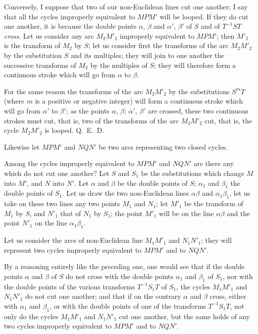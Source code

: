 \documentclass{article}
\begin{document}
Conversely, I suppose that two of our non-Euclidean lines cut one another; I say that all the cycles improperly equivalent to $MPM'$ will be looped. If they do cut one another, it is because the double points $\alpha$, $\beta$ and $\alpha'$, $\beta'$ of $S$ and of $T^{-1}ST$ \emph{cross}. Let us consider any arc $M_{2}M'_{2}$ improperly equivalent to $MPM'$; then $M'_{2}$ is the transform of $M_{2}$ by $S$; let us consider first the transforms of the arc $M_{2}M'_{2}$ by the substitution $S$ and its multiples; they will join to one another the successive transforms of $M_{2}$ by the multiples of $S$; they will therefore form a continuous stroke which will go from $\alpha$ to $\beta$.

For the same reason the transforms of the arc $M_{2}M'_{2}$ by the substitutions $S^{m}T$ (where $m$ is a positive or negative integer) will form a continuous stroke which will go from $\alpha'$ to $\beta'$; as the points $\alpha$, $\beta$; $\alpha'$, $\beta'$ are crossed, these two continuous strokes must cut, that is, two of the transforms of the arc $M_{2}M'_{2}$ cut, that is, the cycle $M_{2}M'_{2}$ is looped. Q.~E.~D.

Likewise let $MPM'$ and $NQN'$ be two arcs representing two closed cycles.

Among the cycles improperly equivalent to $MPM'$ and $NQN'$ are there any which do not cut one another? Let $S$ and $S_{1}$ be the substitutions which change $M$ into $M'$, and $N$ into $N'$. Let $\alpha$ and $\beta$ be the double points of $S$; $\alpha_{1}$ and $\beta_{1}$ the double points of $S_{1}$. Let us draw the two non-Euclidean lines $\alpha\beta$ and $\alpha_{1}\beta_{1}$, let us take on these two lines any two points $M_{1}$ and $N_{1}$; let $M'_{1}$ be the transform of $M_{1}$ by $S$, and $N'_{1}$ that of $N_{1}$ by $S_{1}$; the point $M'_{1}$ will be on the line $\alpha\beta$ and the point $N'_{1}$ on the line $\alpha_{1}\beta_{1}$.

Let us consider the arcs of non-Euclidean line $M_{1}M'_{1}$ and $N_{1}N'_{1}$; they will represent two cycles improperly equivalent to $MPM'$ and to $NQN'$.


By a reasoning entirely like the preceding one, one would see that if the double points $\alpha$ and $\beta$ of $S$ do not cross with the double points $\alpha_{1}$ and $\beta_{1}$ of $S_{1}$, nor with the double points of the various transforms $T^{-1}S_{1}T$ of $S_{1}$, the cycles $M_{1}M'_{1}$ and $N_{1}N'_{1}$ do not cut one another; and that if on the contrary $\alpha$ and $\beta$ cross, either with $\alpha_{1}$ and $\beta_{1}$, or with the double points of one of the transforms $T^{-1}S_{1}T$, not only do the cycles $M_{1}M'_{1}$ and $N_{1}N'_{1}$ cut one another, but the same holds of any two cycles improperly equivalent to $MPM'$ and to $NQN'$.
\end{document}
